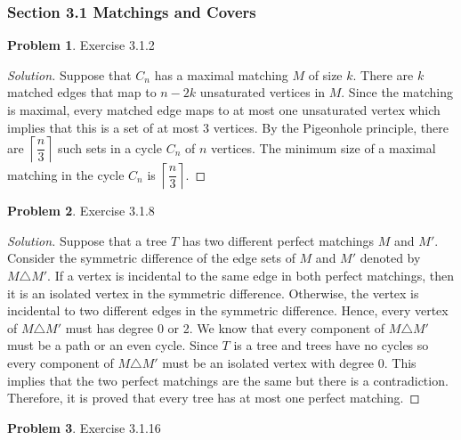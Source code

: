 \documentclass[12pt]{article}
\theoremstyle{definition}
\newtheorem{problem}{Problem}
\newenvironment*{solution}{\begin{proof}[Solution]}{\end{proof}}
\begin{document}
\subsubsection*{Section 3.1 Matchings and Covers}
\begin{problem}
    Exercise 3.1.2
\end{problem}
\begin{solution}
    Suppose that \(C_n\) has a maximal matching \(M\) of size \(k\). There are
    \(k\) matched edges that map to \(n-2k\) unsaturated vertices in \(M\).
    Since the matching is maximal, every matched edge maps to at most one
    unsaturated vertex which implies that this is a set of at most 3 vertices.
    By the Pigeonhole principle, there are
    \(\left\lceil \dfrac{n}{3} \right\rceil\) such sets in a cycle \(C_n\) of
    \(n\) vertices. The minimum size of a maximal matching in the cycle
    \(C_n\) is \(\left\lceil \dfrac{n}{3} \right\rceil\).
\end{solution}
\begin{problem}
    Exercise 3.1.8
\end{problem}
\begin{solution}
    Suppose that a tree \(T\) has two different perfect matchings \(M\) and
    \(M'\). Consider the symmetric difference of the edge sets of \(M\) and
    \(M'\) denoted by \(M\triangle M'\). If a vertex is incidental to the same
    edge in both perfect matchings, then it is an isolated vertex in the
    symmetric difference. Otherwise, the vertex is incidental to two different
    edges in the symmetric difference. Hence, every vertex of
    \(M\triangle M'\) must has degree 0 or 2. We know that every component of
    \(M\triangle M'\) must be a path or an even cycle. Since \(T\) is a tree
    and trees have no cycles so every component of \(M\triangle M'\) must be
    an isolated vertex with degree 0. This implies that the two perfect
    matchings are the same but there is a contradiction. Therefore, it is
    proved that every tree has at most one perfect matching.
\end{solution}
\begin{problem}
    Exercise 3.1.16
\end{problem}
\end{document}
